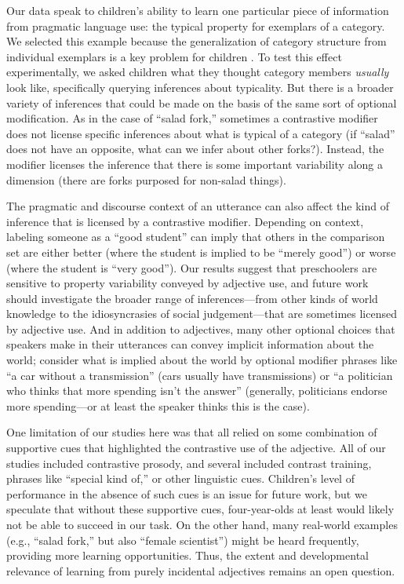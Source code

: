 \documentclass[man]{apa2}
\begin{document}
Our data speak to children's ability to learn one particular piece of information from pragmatic language use: the typical property for exemplars of a category. We selected this example because the generalization of category structure from individual exemplars is a key problem for children \cite{markman1991}. To test this effect experimentally, we asked children what they thought category members \emph{usually} look like, specifically querying inferences about typicality. But there is a broader variety of inferences that could be made on the basis of the same sort of optional modification. As in the case of ``salad fork,'' sometimes a contrastive modifier does not license specific inferences about what is typical of a category (if ``salad'' does not have an opposite, what can we infer about other forks?). Instead, the modifier licenses the inference that there is some important variability along a dimension (there are forks purposed for non-salad things). 

The pragmatic and discourse context of an utterance can also affect the kind of inference that is licensed by a contrastive modifier. Depending on context, labeling someone as a ``good student'' can imply that others in the comparison set are either better (where the student is implied to be ``merely good'') or worse (where the student is ``very good''). Our results suggest that preschoolers are sensitive to property variability conveyed by adjective use, and future work should investigate the broader range of inferences---from other kinds of world knowledge to the idiosyncrasies of social judgement---that are sometimes licensed by adjective use. And in addition to adjectives, many other optional choices that speakers make in their utterances can convey implicit information about the world; consider what is implied about the world by optional modifier phrases like ``a car without a transmission'' (cars usually have transmissions) or ``a politician who thinks that more spending isn't the answer'' (generally, politicians endorse more spending---or at least the speaker thinks this is the case). 

One limitation of our studies here was that all relied on some combination of supportive cues that highlighted the contrastive use of the adjective. All of our studies included contrastive prosody, and several included contrast training, phrases like ``special kind of,'' or other linguistic cues. Children's level of performance in the absence of such cues is an issue for future work, but we speculate that without these supportive cues, four-year-olds at least would likely not be able to succeed in our task. On the other hand, many real-world examples (e.g., ``salad fork,'' but also ``female scientist'') might be heard frequently, providing more learning opportunities. Thus, the extent and developmental relevance of learning from purely incidental adjectives remains an open question. 
\end{document}
